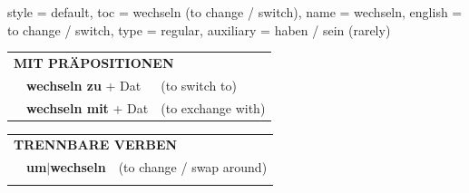 \begin{verbentry}{
  style = {default},
  toc = {wechseln (to change / switch)},
  name = {wechseln},
  english = {to change / switch},
  type = {regular},
  auxiliary = {haben / sein (rarely)}
}
\vspace{10pt}

\begin{tabular}{lll}
\multicolumn{3}{l}{\textbf{MIT PRÄPOSITIONEN}}\\
& \textbf{wechseln zu} + Dat & (to switch to)\\
& \textbf{wechseln mit} + Dat & (to exchange with)\\
\end{tabular}
\hfill
\begin{tabular}{lll}
\multicolumn{3}{l}{\textbf{TRENNBARE VERBEN}}\\
& \textbf{um$|$wechseln} & (to change / swap around)\\
\vspace{10pt}
\end{tabular}
\vspace{-5pt}
\end{verbentry}

